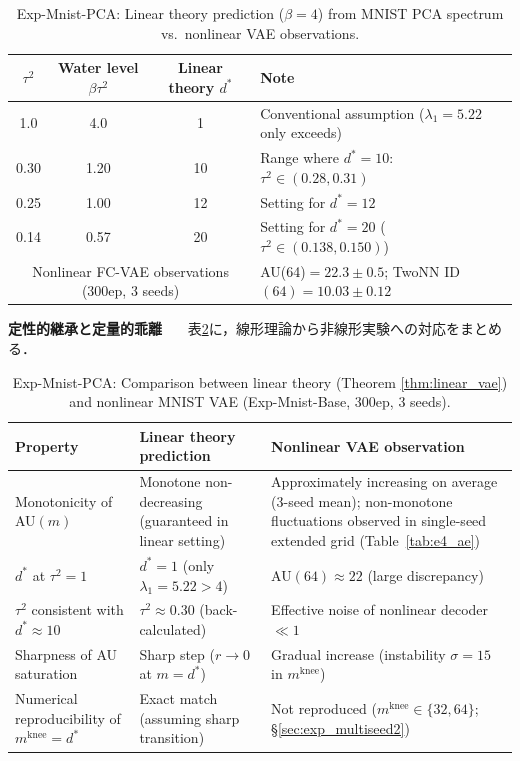\documentclass[11pt,a4paper]{jsarticle}
\newcommand{\mknee}{m^{\mathrm{knee}}}
\begin{document}
\begin{table}[H]
\centering
\caption{Exp-Mnist-PCA: Linear theory prediction ($\beta=4$) from MNIST PCA spectrum vs.\ nonlinear VAE observations.}
\label{tab:theory_pred}
\small
\begin{tabular}{ccc|l}
\toprule
$\tau^2$ & Water level $\beta\tau^2$ & Linear theory $d^*$ & Note \\
\midrule
1.0  & 4.0  & 1   & Conventional assumption ($\lambda_1=5.22$ only exceeds)\\
0.30 & 1.20 & 10  & Range where $d^*=10$: $\tau^2 \in (0.28, 0.31)$ \\
0.25 & 1.00 & 12  & Setting for $d^*=12$ \\
0.14 & 0.57 & 20  & Setting for $d^*=20$ ($\tau^2 \in (0.138, 0.150)$) \\
\midrule
\multicolumn{3}{c|}{Nonlinear FC-VAE observations (300ep, 3 seeds)} & AU(64)$=22.3\pm0.5$; TwoNN ID$(64)=10.03\pm0.12$ \\
\bottomrule
\end{tabular}
\end{table}

\textbf{定性的継承と定量的乖離}~~~
表\ref{tab:theory_inherit}に，線形理論から非線形実験への対応をまとめる．

\begin{table}[H]
\centering
\caption{Exp-Mnist-PCA: Comparison between linear theory (Theorem \ref{thm:linear_vae}) and nonlinear MNIST VAE (Exp-Mnist-Base, 300ep, 3 seeds).}
\label{tab:theory_inherit}
\small
\begin{tabular}{lll}
\toprule
Property & Linear theory prediction & Nonlinear VAE observation \\
\midrule
Monotonicity of AU$(m)$ & Monotone non-decreasing (guaranteed in linear setting) & Approximately increasing on average (3-seed mean); non-monotone fluctuations observed in single-seed extended grid (Table~\ref{tab:e4_ae}) \\
$d^*$ at $\tau^2=1$ & $d^*=1$ (only $\lambda_1=5.22>4$) & AU$(64) \approx 22$ (large discrepancy) \\
$\tau^2$ consistent with $d^* \approx 10$ & $\tau^2 \approx 0.30$ (back-calculated) & Effective noise of nonlinear decoder $\ll 1$ \\
Sharpness of AU saturation & Sharp step ($r\to 0$ at $m=d^*$) & Gradual increase (instability $\sigma=15$ in $\mknee$) \\
Numerical reproducibility of $\mknee = d^*$ & Exact match (assuming sharp transition) & Not reproduced ($\mknee \in \{32,64\}$; §\ref{sec:exp_multiseed2}) \\
\bottomrule
\end{tabular}
\end{table}
\end{document}
